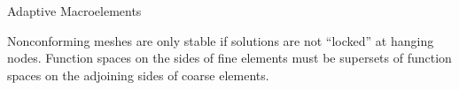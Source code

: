 \begin{foil}{Adaptive Macroelements}

Nonconforming meshes are only stable if solutions are not ``locked''
at hanging nodes.  Function spaces on the sides of fine elements must
be supersets of function spaces on the adjoining sides of coarse
elements.

\begin{center}
\end{center}

\end{foil}


